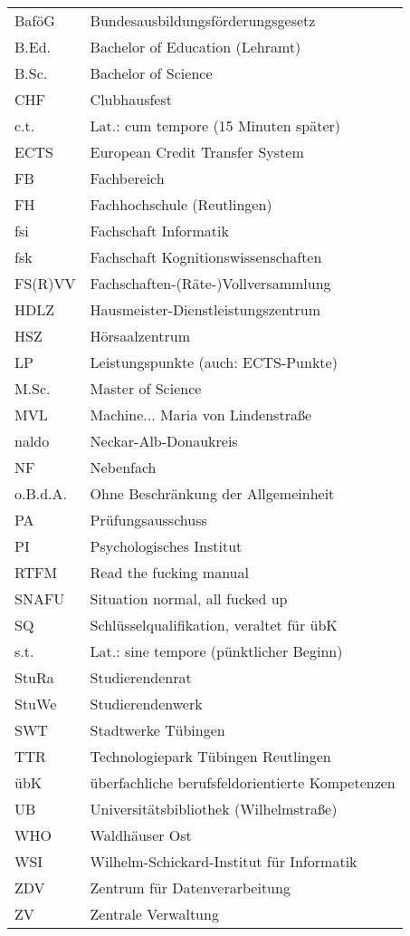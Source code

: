 \renewcommand{\arraystretch}{1.2}
\begin{tabular}{ll}
BaföG    & Bundesausbildungsförderungsgesetz \\
B.Ed.    & Bachelor of Education (Lehramt) \\
B.Sc.    & Bachelor of Science \\
CHF      & Clubhausfest \\
c.t.     & Lat.: cum tempore (15 Minuten später) \\
ECTS     & European Credit Transfer System \\
FB       & Fachbereich \\
FH       & Fachhochschule (Reutlingen) \\
fsi      & Fachschaft Informatik \\
fsk      & Fachschaft Kognitionswissenschaften \\
FS(R)VV  & Fachschaften-(Räte-)Vollversammlung \\
HDLZ     & Hausmeister-Dienstleistungszentrum \\
HSZ      & Hörsaalzentrum \\
LP       & Leistungspunkte (auch: ECTS-Punkte) \\
M.Sc.    & Master of Science \\
MVL      & Machine... Maria von Lindenstraße \\
naldo    & Neckar-Alb-Donaukreis\\
NF       & Nebenfach \\
o.B.d.A. & Ohne Beschränkung der Allgemeinheit \\
PA       & Prüfungsausschuss \\
PI       & Psychologisches Institut \\
RTFM     & Read the fucking manual \\
SNAFU    & Situation normal, all fucked up \\
SQ       & Schlüsselqualifikation, veraltet für übK\\
s.t.     & Lat.: sine tempore (pünktlicher Beginn) \\
StuRa    & Studierendenrat \\
StuWe    & Studierendenwerk \\
SWT      & Stadtwerke Tübingen \\
TTR      & Technologiepark Tübingen Reutlingen \\
übK      & überfachliche berufsfeldorientierte Kompetenzen \\
UB       & Universitätsbibliothek (Wilhelmstraße) \\
WHO      & Waldhäuser Ost \\
WSI      & Wilhelm-Schickard-Institut für Informatik \\
ZDV      & Zentrum für Datenverarbeitung \\
ZV       & Zentrale Verwaltung\\
\end{tabular}
\vfill %
